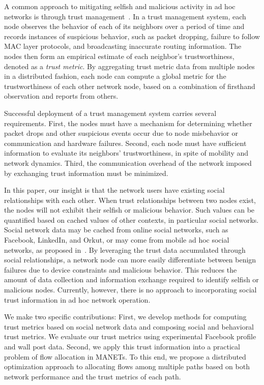 \documentclass[conference]{IEEEtran}
\begin{document}
A common approach to mitigating selfish and malicious activity in ad hoc networks is through trust management~\cite{kannan_trust}.
In a trust management system, each node observes the behavior of each of its neighbors over a period of time and records instances of suspicious behavior, such as packet dropping, failure to follow MAC layer protocols, and broadcasting inaccurate routing information.  The nodes then form an empirical estimate of each neighbor's trustworthiness, denoted as a \emph{trust metric}.  By aggregating trust metric data from multiple nodes in a distributed fashion, each node can compute a global metric for the trustworthiness of each other network node, based on a combination of firsthand observation and reports from others.


Successful deployment of a trust management system carries several requirements.  First, the nodes must have a mechanism for determining whether packet drops and other suspicious events occur due to node misbehavior or communication and hardware failures.  Second, each node must have sufficient information to evaluate its neighbors' trustworthiness, in spite of mobility and network dynamics.  Third, the communication overhead of the network imposed by exchanging trust information must be minimized.  	


 In this paper, our insight is that the network users have existing social relationships with each other. When trust relationships between two nodes  exist, the nodes will not exhibit their selfish or malicious behavior. Such values can be quantified based on cached values of other contexts, in particular social networks. Social network data may be cached from online social networks, such as Facebook, LinkedIn, and Orkut, or may come from mobile ad hoc social networks, as proposed in~\cite{li09mobisn,sarigl09,gurecki09}.
By leveraging the trust data accumulated through social relationships, a network node can more easily differentiate between benign failures due to device constraints and malicious behavior.
	This  reduces the amount of data collection and information exchange required to identify selfish or malicious nodes.
	Currently, however, there is no approach to incorporating social trust information in ad hoc network operation.

	We make two specific contributions:
	First, we develop methods for computing trust metrics based on social network data and composing social and behavioral trust metrics.
    We evaluate our trust metrics using experimental Facebook profile and wall post data.
Second, we apply this trust information into a practical problem of flow allocation in MANETs. To this end, we propose a distributed optimization approach to allocating flows among multiple paths based on both network performance and the trust metrics of each path.
	
\end{document}
